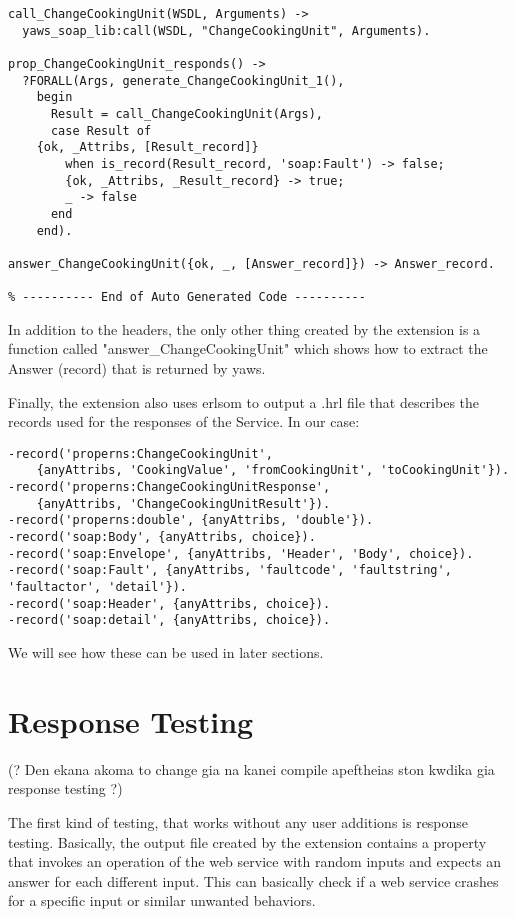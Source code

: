 \documentclass[submission,copyright]{eptcs}
\begin{document}
\begin{lstlisting}
call_ChangeCookingUnit(WSDL, Arguments) ->
  yaws_soap_lib:call(WSDL, "ChangeCookingUnit", Arguments).

prop_ChangeCookingUnit_responds() ->
  ?FORALL(Args, generate_ChangeCookingUnit_1(),
    begin
      Result = call_ChangeCookingUnit(Args),
      case Result of
	{ok, _Attribs, [Result_record]} 
	    when is_record(Result_record, 'soap:Fault') -> false;
        {ok, _Attribs, _Result_record} -> true;
        _ -> false
      end
    end).

answer_ChangeCookingUnit({ok, _, [Answer_record]}) -> Answer_record.

% ---------- End of Auto Generated Code ---------- 
\end{lstlisting}

In addition to the headers, the only other thing created by the extension is a function called "answer\_ChangeCookingUnit" which shows how to extract the Answer (record) that is returned by yaws.

Finally, the extension also uses erlsom to output a .hrl file that describes the records used for the responses of the Service. In our case:

\begin{lstlisting}
-record('properns:ChangeCookingUnit', 
	{anyAttribs, 'CookingValue', 'fromCookingUnit', 'toCookingUnit'}).
-record('properns:ChangeCookingUnitResponse', 
	{anyAttribs, 'ChangeCookingUnitResult'}).
-record('properns:double', {anyAttribs, 'double'}).
-record('soap:Body', {anyAttribs, choice}).
-record('soap:Envelope', {anyAttribs, 'Header', 'Body', choice}).    
-record('soap:Fault', {anyAttribs, 'faultcode', 'faultstring', 'faultactor', 'detail'}).  
-record('soap:Header', {anyAttribs, choice}).
-record('soap:detail', {anyAttribs, choice}).
\end{lstlisting}

We will see how these can be used in later sections.

\section{Response Testing}

(? Den ekana akoma to change gia na kanei compile apeftheias ston kwdika gia response testing ?)

The first kind of testing, that works without any user additions is response testing. Basically, the output file created by the extension contains a property that invokes an operation of the web service with random inputs and expects an answer for each different input. This can basically check if a web service crashes for a specific input or similar unwanted behaviors. 
\end{document}
